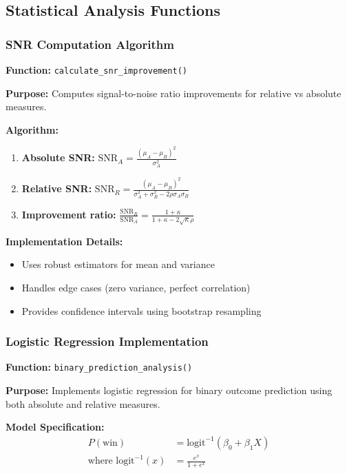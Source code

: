\subsection{Statistical Analysis Functions}

\subsubsection{SNR Computation Algorithm}

\textbf{Function:} \texttt{calculate\_snr\_improvement()}

\textbf{Purpose:} Computes signal-to-noise ratio improvements for relative vs absolute measures.

\textbf{Algorithm:}
\begin{enumerate}
    \item \textbf{Absolute SNR:} $\text{SNR}_A = \frac{(\mu_A - \mu_B)^2}{\sigma_A^2}$
    \item \textbf{Relative SNR:} $\text{SNR}_R = \frac{(\mu_A - \mu_B)^2}{\sigma_A^2 + \sigma_B^2 - 2\rho\sigma_A\sigma_B}$
    \item \textbf{Improvement ratio:} $\frac{\text{SNR}_R}{\text{SNR}_A} = \frac{1 + \kappa}{1 + \kappa - 2\sqrt{\kappa}\rho}$
\end{enumerate}

\textbf{Implementation Details:}
\begin{itemize}
    \item Uses robust estimators for mean and variance
    \item Handles edge cases (zero variance, perfect correlation)
    \item Provides confidence intervals using bootstrap resampling
\end{itemize}

\subsubsection{Logistic Regression Implementation}

\textbf{Function:} \texttt{binary\_prediction\_analysis()}

\textbf{Purpose:} Implements logistic regression for binary outcome prediction using both absolute and relative measures.

\textbf{Model Specification:}
\begin{align}
P(\text{win}) &= \text{logit}^{-1}(\beta_0 + \beta_1 X) \\
\text{where } \text{logit}^{-1}(x) &= \frac{e^x}{1 + e^x}
\end{align}

